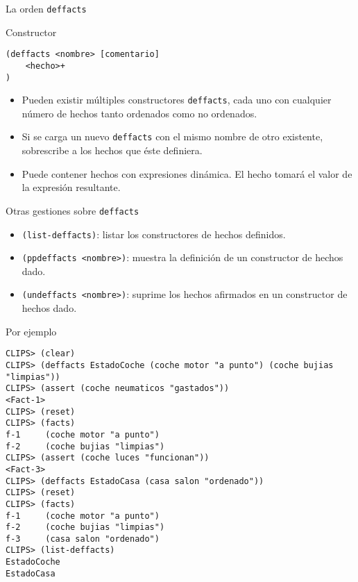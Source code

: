 \documentclass[usenames,dvipsnames,aspectratio=169]{beamer}
\begin{document}
\begin{frame}[fragile]{La orden \texttt{deffacts}}
	\begin{block}{Constructor}
		\begin{verbatim}
(deffacts <nombre> [comentario]
    <hecho>+
)
		\end{verbatim}
	\end{block}
	\begin{itemize}
		\item Pueden existir múltiples constructores \texttt{deffacts}, cada uno con cualquier número de hechos tanto ordenados como no ordenados.
		\item Si se carga un nuevo \texttt{deffacts} con el mismo nombre de otro existente, sobrescribe a los hechos que éste definiera.
		\item Puede contener hechos con expresiones dinámica. El hecho tomará el valor de la expresión resultante.
	\end{itemize}
\end{frame}

\begin{frame}{Otras gestiones sobre \texttt{deffacts}}
	\begin{itemize}
		\item \texttt{(list-deffacts)}: listar los constructores de hechos definidos.
		\item \texttt{(ppdeffacts <nombre>)}: muestra la definición de un constructor de hechos dado.
		\item \texttt{(undeffacts <nombre>)}: suprime los hechos afirmados en un constructor de hechos dado.
	\end{itemize}
\end{frame}

\begin{frame}[fragile]{Por ejemplo}
	\scriptsize
	\begin{verbatim}
CLIPS> (clear)
CLIPS> (deffacts EstadoCoche (coche motor "a punto") (coche bujias "limpias"))
CLIPS> (assert (coche neumaticos "gastados"))
<Fact-1>
CLIPS> (reset)
CLIPS> (facts)
f-1     (coche motor "a punto")
f-2     (coche bujias "limpias")
CLIPS> (assert (coche luces "funcionan"))
<Fact-3>
CLIPS> (deffacts EstadoCasa (casa salon "ordenado"))
CLIPS> (reset)
CLIPS> (facts)
f-1     (coche motor "a punto")
f-2     (coche bujias "limpias")
f-3     (casa salon "ordenado")
CLIPS> (list-deffacts)
EstadoCoche
EstadoCasa
	\end{verbatim}
\end{frame}

\begin{frame}
\titlepage
\end{frame}
\end{document}
